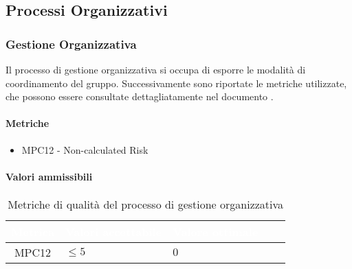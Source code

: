 \subsection{Processi Organizzativi}
\subsubsection{Gestione Organizzativa}
Il processo di gestione organizzativa si occupa di esporre le modalità di coordinamento del gruppo. Successivamente sono riportate le metriche utilizzate, che possono essere consultate dettagliatamente nel documento .
\paragraph{Metriche}
\begin{itemize}
	\item MPC12 - Non-calculated Risk 
\end{itemize}

\paragraph{Valori ammissibili}
{
\renewcommand{\arraystretch}{1.5}
\centering
\begin{longtable}{c C{2.6cm} C{3cm} C{2.6cm} C{5cm}}
\textcolor{white}{\textbf{Metrica}}&
\textcolor{white}{\textbf{Valori accettabile}}&
\textcolor{white}{\textbf{Valore ottimale}}\\	
\endhead
\endfoot
{}\caption{Metriche di qualità del processo di gestione organizzativa}
\endlastfoot

MPC12 & $ \leq 5 $ & $ 0 $ \\
 
\end{longtable}
}